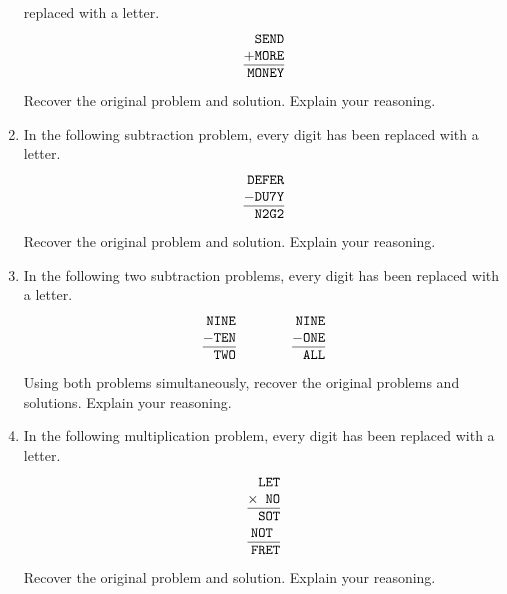 \begin{problems}
\begin{enumerate}
  replaced with a letter.
\[
\begin{tabular}{@{}r@{}}
\texttt{SEND}\\
$+$\texttt{MORE}\\ \hline
\texttt{MONEY}
\end{tabular}
\]
Recover the original problem and solution. Explain your reasoning.
\item In the following subtraction problem, every digit has been
  replaced with a letter.
\[
\begin{tabular}{@{}r@{}}
\texttt{DEFER}\\
$-$\texttt{DU7Y}\\ \hline
\texttt{N2G2}
\end{tabular}
\]
Recover the original problem and solution. Explain your reasoning.
\item In the following two subtraction problems, every digit has been
  replaced with a letter.
\[
\begin{tabular}{@{}r@{}}
\texttt{NINE}\\
$-$\texttt{TEN}\\ \hline
\texttt{TWO}
\end{tabular}
\qquad\qquad
\begin{tabular}{@{}r@{}}
\texttt{NINE}\\
$-$\texttt{ONE}\\ \hline
\texttt{ALL}
\end{tabular}
\]
Using both problems simultaneously, recover the original problems and
solutions. Explain your reasoning.
\item In the following multiplication problem, every digit has been
  replaced with a letter.
\[
\begin{tabular}{@{}r@{}}
\texttt{LET}\\
$\times$\texttt{ NO}\\ \hline
\texttt{SOT}\\
\texttt{NOT$~$}\\
\hline
\texttt{FRET}
\end{tabular}
\]
Recover the original problem and solution. Explain your reasoning.



\end{enumerate}
\end{problems}
